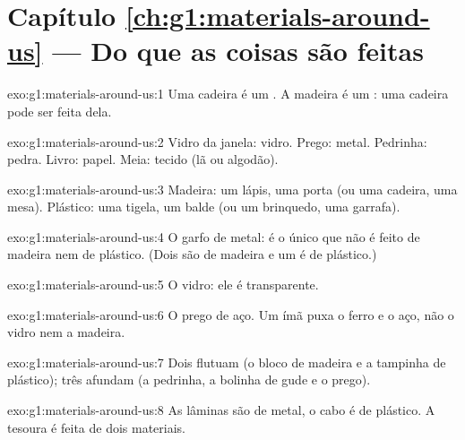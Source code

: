 \section*{Capítulo \ref{ch:g1:materials-around-us} --- Do que as coisas são feitas}

\begin{solution}{exo:g1:materials-around-us:1}
Uma cadeira é um . A madeira é um : uma cadeira pode ser feita dela.
\end{solution}

\begin{solution}{exo:g1:materials-around-us:2}
Vidro da janela: vidro. Prego: metal. Pedrinha: pedra. Livro: papel.
Meia: tecido (lã ou algodão).
\end{solution}

\begin{solution}{exo:g1:materials-around-us:3}
Madeira: um lápis, uma porta (ou uma cadeira, uma mesa). Plástico: uma
tigela, um balde (ou um brinquedo, uma garrafa).
\end{solution}

\begin{solution}{exo:g1:materials-around-us:4}
O garfo de metal: é o único que não é feito de madeira nem de plástico.
(Dois são de madeira e um é de plástico.)
\end{solution}

\begin{solution}{exo:g1:materials-around-us:5}
O vidro: ele é transparente.
\end{solution}

\begin{solution}{exo:g1:materials-around-us:6}
O prego de aço. Um ímã puxa o ferro e o aço, não o vidro nem a madeira.
\end{solution}

\begin{solution}{exo:g1:materials-around-us:7}
Dois  flutuam (o bloco de madeira e a tampinha de plástico); três
afundam (a pedrinha, a bolinha de gude e o prego).
\end{solution}

\begin{solution}{exo:g1:materials-around-us:8}
As lâminas são de metal, o cabo é de plástico. A tesoura é feita de dois
materiais.
\end{solution}

